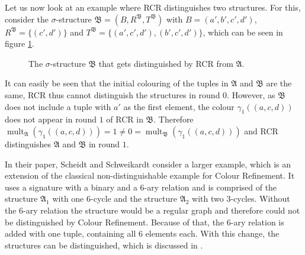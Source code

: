 Let us now look at an example where RCR distinguishes two structures.
For this, consider the $\sigma$-structure $\mathfrak B=(B, R^{\mathfrak B}, T^{\mathfrak B})$ with $B=(a',b',c',d')$, $R^{\mathfrak B}=\{(c',d')\}$ and $T^{\mathfrak B}=\{(a',c',d'),(b',c',d')\}$, which can be seen in figure \ref{fig:distinguishedByRCR}.
\begin{figure}
	\centering
	\caption{The $\sigma$-structure $\mathfrak B$ that gets distinguished by RCR from $\mathfrak A$.}
	\label{fig:distinguishedByRCR}
\end{figure}
It can easily be seen that the initial colouring of the tuples in $\mathfrak A$ and $\mathfrak B$ are the same, RCR thus cannot distinguish the structures in round $0$.
However, as $\mathfrak B$ does not include a tuple with $a'$ as the first element, the colour $\gamma_1((a,c,d))$ does not appear in round $1$ of RCR in $\mathfrak B$.
Therefore $\operatorname{mult}_{\mathfrak A}(\gamma_1((a,c,d)))=1\neq 0 = \operatorname{mult}_{\mathfrak B}(\gamma_1((a,c,d)))$ and RCR distinguishes $\mathfrak A$ and $\mathfrak B$ in round $1$.

In their paper, Scheidt and Schweikardt consider a larger example, which is an extension of the classical non-distinguishable example for Colour Refinement.
It uses a signature with a binary and a $6$-ary relation and is comprised of the structure $\mathfrak A_1$ with one $6$-cycle and the structure $\mathfrak A_2$ with two $3$-cycles.
Without the $6$-ary relation the structure would be a regular graph and therefore could not be distinguished by Colour Refinement.
Because of that, the $6$-ary relation is added with one tuple, containing all $6$ elements each.
With this change, the structures can be distinguished, which is discussed in \cite{scheidt2025ColorRefinement}.

